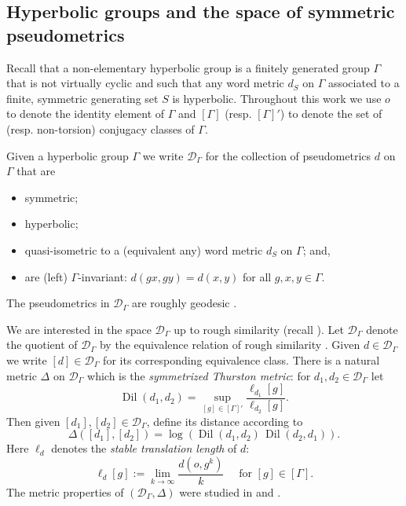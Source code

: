 \documentclass[twoside]{amsart}
\theoremstyle{definition}
\numberwithin{equation}{section}
\numberwithin{theorem}{section}
\newcommand{\Dc}{{\mathcal D}}
\newcommand{\scrD}{\mathscr{D}}
\newcommand{\G}{\Gamma}
\newcommand{\D}{\Delta}
\DeclareMathOperator{\Dil}{Dil}
\begin{document}

\subsection{Hyperbolic groups and the space of symmetric pseudometrics}\label{subsec:hypgroups}

Recall that a non-elementary hyperbolic group is a finitely generated group $\G$ that is not virtually cyclic and such that any word metric $d_S$ on $\G$ associated to a finite, symmetric generating set $S$ is hyperbolic. Throughout this work we use $o$ to denote the identity element of $\G$ and $[\G]$ (resp. $[\G]'$) to denote the set of (resp. non-torsion) conjugacy classes of $\G$.

Given a hyperbolic group $\G$ we write $\Dc_\G$ for the collection of pseudometrics $d$ on $\G$ that are
\begin{itemize}
    \item symmetric;
    \item hyperbolic;
    \item quasi-isometric to a (equivalent any) word metric $d_S$ on $\G$; and,
    \item are (left) $\G$-invariant: $d(gx,gy) = d(x,y)$ for all $g, x, y \in \G$.
\end{itemize}

\noindent The pseudometrics in $\Dc_\G$ are roughly geodesic \cite[Theorem~2.2]{BHM.harmonic}.

We are interested in the space $\Dc_\G$ up to rough similarity (recall ). Let $\scrD_\G$ denote the quotient of $\Dc_\G$ by the equivalence relation of rough similarity \cite{furman}. Given $d \in \Dc_\G$ we write $[d] \in \scrD_\G$ for its corresponding equivalence class. There is a natural metric $\D$ on $\scrD_\G$ which is the \emph{symmetrized Thurston metric}:
for $d_1,d_2 \in \Dc_\G$ let 
\[
\Dil(d_1,d_2) = \sup_{[g] \in [\G]'} \frac{\ell_{d_1}[g]}{\ell_{d_2}[g]}.
\]
Then given $[d_1], [d_2] \in \scrD_\G$, define its distance according to
\begin{equation*}
\D([d_1],[d_2]) = \log (\Dil(d_1,d_2) \, \Dil(d_2,d_1)).
\end{equation*}
Here $\ell_d$ denotes the \emph{stable translation length} of $d$:
\[\ell_d[g]:=\lim_{k\to \infty}\frac{d(o,g^k)}{k} \quad \text{ for }[g]\in [\G].\]
The metric properties of $(\scrD_\G, \D)$ were studied in \cite{oregonreyes.metric} and \cite{cantrell-reyes.manhattan}. 
\end{document}
